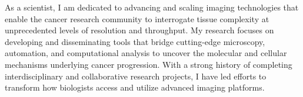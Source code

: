 \forceindent As a scientist, I am dedicated to advancing and scaling imaging technologies that enable the cancer research community to interrogate tissue complexity at unprecedented levels of resolution and throughput. My research focuses on developing and disseminating tools that bridge cutting-edge microscopy, automation, and computational analysis to uncover the molecular and cellular mechanisms underlying cancer progression. With a strong history of completing interdisciplinary and collaborative research projects, I have led efforts to transform how biologists access and utilize advanced imaging platforms. 